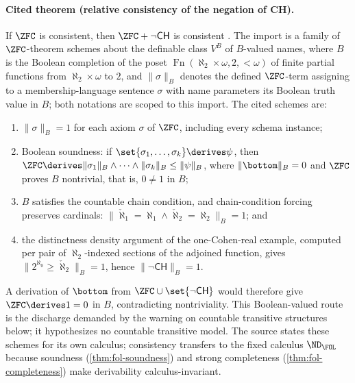 \paragraph{Cited theorem (relative consistency of the negation of CH).}
If \(\ZFC\) is consistent, then \(\ZFC+\neg\mathsf{CH}\) is consistent
\cite[Chapter~14, pp.~201--224]{Jech2003}.  The import is a family of
\(\ZFC\)-theorem schemes about the definable class \(V^{B}\) of
\(B\)-valued names, where \(B\) is the Boolean completion of the poset
\(\operatorname{Fn}(\aleph_2\times\omega,2,{<}\omega)\) of finite partial
functions from \(\aleph_2\times\omega\) to \(2\), and
\(\lVert\sigma\rVert_{B}\) denotes the defined \(\ZFC\)-term assigning to
a membership-language sentence \(\sigma\) with name parameters its Boolean
truth value in \(B\); both notations are scoped to this import.  The
cited schemes are:
\begin{enumerate}
  \item \(\lVert\sigma\rVert_{B}=1\) for each axiom \(\sigma\) of
        \(\ZFC\), including every schema instance;
  \item Boolean soundness: if
        \(\set{\sigma_1,\ldots,\sigma_k}\derives\psi\), then
        \(\ZFC\derives
          \lVert\sigma_1\rVert_{B}\wedge\cdots\wedge
          \lVert\sigma_k\rVert_{B}\leq\lVert\psi\rVert_{B}\),
        where \(\lVert\bottom\rVert_{B}=0\) and \(\ZFC\) proves \(B\)
        nontrivial, that is, \(0\ne1\) in \(B\);
  \item \(B\) satisfies the countable chain condition, and
        chain-condition forcing preserves cardinals:
        \(\lVert\check\aleph_1=\aleph_1\land
           \check\aleph_2=\aleph_2\rVert_{B}=1\); and
  \item the distinctness density argument of the one-Cohen-real example,
        computed per pair of \(\aleph_2\)-indexed sections of the adjoined
        function, gives
        \(\lVert 2^{\aleph_0}\geq\check\aleph_2\rVert_{B}=1\), hence
        \(\lVert\neg\mathsf{CH}\rVert_{B}=1\).
\end{enumerate}
A derivation of \(\bottom\) from \(\ZFC\cup\set{\neg\mathsf{CH}}\) would
therefore give \(\ZFC\derives 1=0\) in \(B\), contradicting
nontriviality.  This Boolean-valued route is the discharge demanded by
the warning on countable transitive structures below; it hypothesizes no
countable transitive model.  The source states these schemes for its own
calculus; consistency transfers to the fixed calculus \(\ND_{\FOL}\)
because soundness (\cref{thm:fol-soundness}) and strong completeness
(\cref{thm:fol-completeness}) make derivability calculus-invariant.


